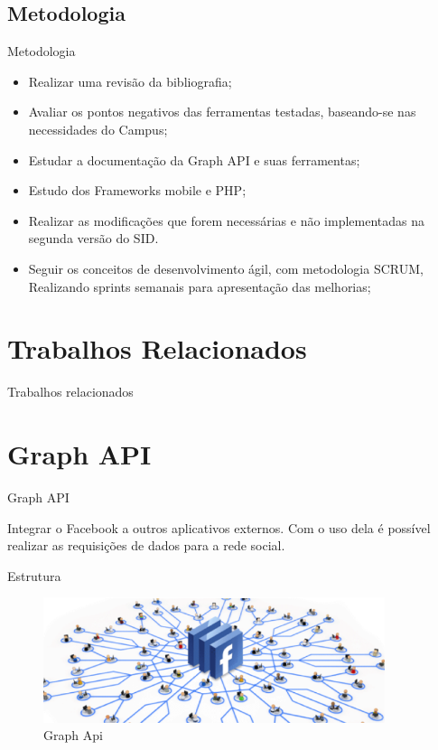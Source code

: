 \documentclass{aula-ifb}
\begin{document}
\subsection{Metodologia}
\begin{frame}{Metodologia}
	\begin{itemize}
   		\item Realizar uma revisão da bibliografia;
   		\vspace{10px}
   		\item Avaliar os pontos negativos das ferramentas testadas, baseando-se nas necessidades do Campus;
   		\vspace{10px}
   		\item Estudar a documentação da Graph API e suas ferramentas;
   		\vspace{10px}
   		\item Estudo dos Frameworks mobile e PHP;
   		\vspace{10px}
   		\item Realizar as modificações que forem necessárias e não implementadas na segunda versão do SID.
   		\vspace{10px}
   		\item Seguir os conceitos de desenvolvimento ágil, com metodologia SCRUM, Realizando sprints semanais para apresentação das melhorias;
	\end{itemize}
\end{frame}

\section{Trabalhos Relacionados}
\begin{frame}{Trabalhos relacionados}
\end{frame}

\section{Graph API}
\begin{frame}{Graph API}
	\begin{center}
	Integrar o Facebook a outros aplicativos externos. Com o uso dela é possível realizar as requisições de dados para a rede social.
	\end{center}
\end{frame}

\begin{frame}{Estrutura}
	\begin{figure}[h]
		\includegraphics[width=10cm]{figuras/facebookgraph.png}
		\caption{Graph Api}
		\label{fig:facebookgraph}
	\end{figure}
\end{frame}
\end{document}
